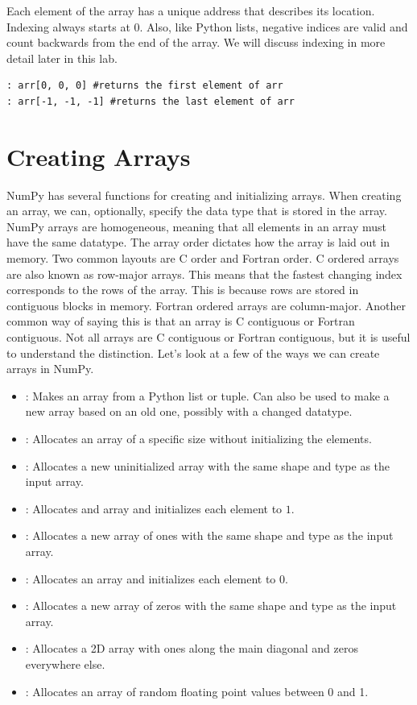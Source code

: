 Each element of the array has a unique address that describes its location.
Indexing always starts at $0$.
Also, like Python lists, negative indices are valid and count backwards from the end of the array.
We will discuss indexing in more detail later in this lab.
\begin{lstlisting}
: arr[0, 0, 0] #returns the first element of arr
: arr[-1, -1, -1] #returns the last element of arr
\end{lstlisting}

\section*{Creating Arrays}
NumPy has several functions for creating and initializing arrays.
When creating an array, we can, optionally, specify the data type that is stored in the array.
NumPy arrays are homogeneous, meaning that all elements in an array must have the same datatype.
The array order dictates how the array is laid out in memory.
Two common layouts are C order and Fortran order.
C ordered arrays are also known as row-major arrays.
This means that the fastest changing index corresponds to the rows of the array.
This is because rows are stored in contiguous blocks in memory.
Fortran ordered arrays are column-major.
Another common way of saying this is that an array is C contiguous or Fortran contiguous.
Not all arrays are C contiguous or Fortran contiguous, but it is useful to understand the distinction.
Let's look at a few of the ways we can create arrays in NumPy.
\begin{itemize}
\item {}: Makes an array from a Python list or tuple.
Can also be used to make a new array based on an old one, possibly with a changed datatype.
\item {}: Allocates an array of a specific size without initializing the elements.
\item {}: Allocates a new uninitialized array with the same shape and type as the input array.
\item {}: Allocates and array and initializes each element to $1$.
\item {}: Allocates a new array of ones with the same shape and type as the input array.
\item {}: Allocates an array and initializes each element to $0$.
\item {}: Allocates a new array of zeros with the same shape and type as the input array.
\item {}: Allocates a 2D array with ones along the main diagonal and zeros everywhere else.
\item {}: Allocates an array of random floating point values between 0 and 1.
\end{itemize}

